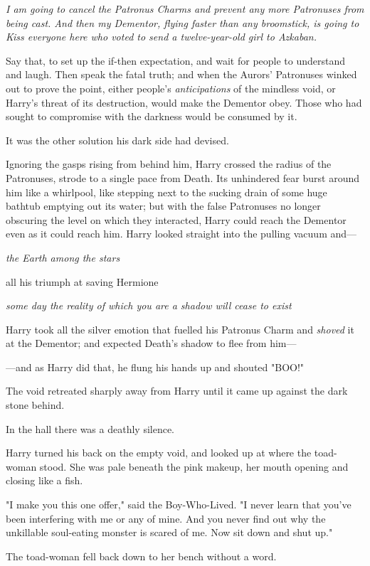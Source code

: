 \emph{I am going to cancel the Patronus Charms and prevent any more Patronuses
from being cast. And then my Dementor, flying faster than any broomstick, is
going to Kiss everyone here who voted to send a twelve-year-old girl to
Azkaban.}

Say that, to set up the if-then expectation, and wait for people to understand
and laugh. Then speak the fatal truth; and when the Aurors' Patronuses winked
out to prove the point, either people's \emph{anticipations} of the mindless
void, or Harry's threat of its destruction, would make the Dementor obey. Those
who had sought to compromise with the darkness would be consumed by it.

It was the other solution his dark side had devised.

Ignoring the gasps rising from behind him, Harry crossed the radius of the
Patronuses, strode to a single pace from Death. Its unhindered fear burst
around him like a whirlpool, like stepping next to the sucking drain of some
huge bathtub emptying out its water; but with the false Patronuses no longer
obscuring the level on which they interacted, Harry could reach the Dementor
even as it could reach him. Harry looked straight into the pulling vacuum and—

\emph{the Earth among the stars}

all his triumph at saving Hermione

\emph{some day the reality of which you are a shadow will cease to exist}

Harry took all the silver emotion that fuelled his Patronus Charm and
\emph{shoved} it at the Dementor; and expected Death's shadow to flee from
him—

—and as Harry did that, he flung his hands up and shouted "BOO!"

The void retreated sharply away from Harry until it came up against the dark
stone behind.

In the hall there was a deathly silence.

Harry turned his back on the empty void, and looked up at where the toad-woman
stood. She was pale beneath the pink makeup, her mouth opening and closing like
a fish.

"I make you this one offer," said the Boy-Who-Lived. "I never learn that you've
been interfering with me or any of mine. And you never find out why the
unkillable soul-eating monster is scared of me. Now sit down and shut up."

The toad-woman fell back down to her bench without a word.

